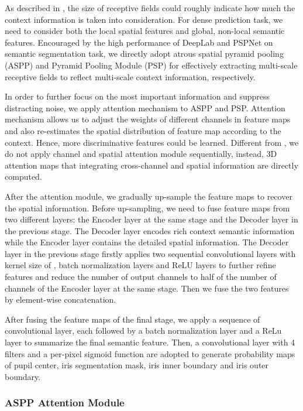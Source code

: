 \documentclass[journal]{IEEEtran}
\begin{document}
As described in \cite{zhao2017pyramid}, the size of receptive fields could roughly indicate how much the context information is taken into consideration. For dense prediction task, we need to consider both the local spatial features and global, non-local semantic features. Encouraged by the high performance of DeepLab\cite{chen2017rethinking} and PSPNet\cite{zhao2017pyramid} on semantic segmentation task, we directly adopt atrous spatial pyramid pooling (ASPP) and Pyramid Pooling Module (PSP) for effectively extracting multi-scale receptive fields to reflect multi-scale context information, respectively.

In order to further focus on the most important information and suppress distracting noise, we apply attention mechanism to ASPP and PSP.
Attention mechanism allows us to adjust the weights of different channels in feature maps and also re-estimates the spatial distribution of feature map according to the context\cite{Mnih2014Recurrent,Wang2017Residual,yu2018learning,Woo2018CBAM,Park2018BAM}. Hence, more discriminative features could be learned. Different from \cite{Woo2018CBAM}, we do not apply channel and spatial attention module sequentially, instead, 3D attention maps that integrating cross-channel and spatial information are directly computed.

After the attention module, we gradually up-sample the feature maps to recover the spatial information. Before up-sampling, we need to fuse feature maps from two different layers: the Encoder layer at the same stage and the Decoder layer in the previous stage. The Decoder layer encodes rich context semantic information while the Encoder layer contains the detailed spatial information. The Decoder layer in the previous stage firstly applies two sequential convolutional layers with kernel size of , batch normalization layers and ReLU layers to further refine features and reduce the number of output channels to half of the number of channels of the Encoder layer at the same stage. Then we fuse the two features by element-wise concatenation.

After fusing the feature maps of the final stage, we apply a sequence of  convolutional layer, each followed by a batch normalization layer and a ReLu layer to summarize the final semantic feature. Then, a  convolutional layer with 4 filters and a per-pixel sigmoid function are adopted to generate probability maps of pupil center, iris segmentation mask, iris inner boundary and iris outer boundary.

\subsubsection{ASPP Attention Module}
\end{document}
